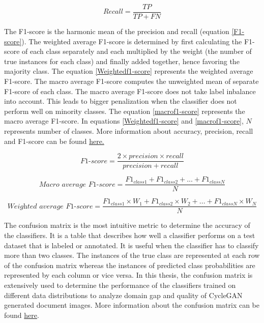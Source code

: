\begin{equation}\label{recall}
\textit{Recall} = \frac{TP}{TP + FN}
\end{equation}

\newpage
The F1-score is the harmonic mean of the precision and recall (equation \ref{F1-score}). The weighted average F1-score is determined by first calculating the F1-score of each class separately and each multiplied by the weight (the number of true instances for each class) and finally added together, hence favoring the majority class\footnotemark. The equation \ref{Weightedf1-score} represents the weighted average F1-score. The macro average F1-score computes the unweighted mean of separate F1-score of each class. The macro average F1-score does not take label inbalance into account\footnotemark[\value{footnote}]. This leads to bigger penalization when the classifier does not perform well on minority classes. The equation \ref{macrof1-score} represents the macro average F1-score. In equations \ref{Weightedf1-score} and \ref{macrof1-score}, $N$ represents number of classes. More information about accuracy, precision, recall and F1-score can be found \href{https://en.wikipedia.org/wiki/Precision_and_recall}{here.}



\begin{equation}\label{F1-score}
\textit{F1-score} = \frac{2 \times precision \times recall}{precision + recall}
\end{equation}


\begin{equation}\label{macrof1-score} 
\textit{Macro average F1-score} =  \frac{F1_{class1} + F1_{class2}+ ... + F1_{classN}}{N}
\end{equation}


\begin{equation}\label{Weightedf1-score} 
\textit{Weighted average F1-score} =  \frac{F1_{class1} \times W_1 + F1_{class2} \times W_2 + ... + F1_{classN} \times W_N}{N}
\end{equation}

The confusion matrix is the most intuitive metric to determine the accuracy of the classifiers. It is a table that describes how well a classifier performs on a test dataset that is labeled or annotated. It is useful when the classifier has to classify more than two classes. The instances of the true class are represented at each row of the confusion matrix whereas the instances of predicted class probabilities are represented by each column or vice versa. In this thesis, the confusion matrix is extensively used to determine the performance of the classifiers trained on different data distributions to analyze domain gap and quality of \ac{CycleGAN} generated document images. More information about the confusion matrix can be found \href{https://en.wikipedia.org/wiki/Confusion_matrix}{here}.

